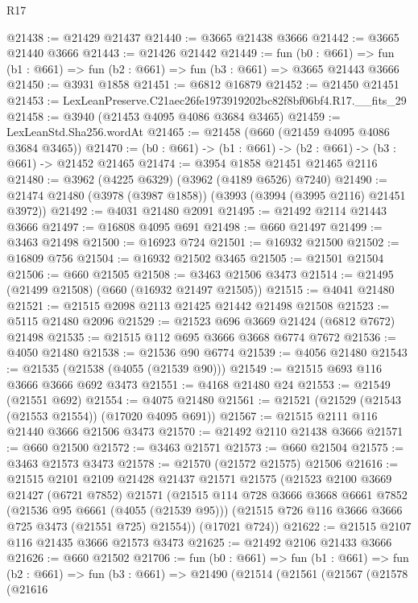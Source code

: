 \begin{lexlean}{R17}
\begin{coremodule}
@21438 := @21429 @21437
@21440 := @3665 @21438 @3666
@21442 := @3665 @21440 @3666
@21443 := @21426 @21442
@21449 := fun (b0 : @661) =>
  fun (b1 : @661) => fun (b2 : @661) => fun (b3 : @661) => @3665 @21443 @3666
@21450 := @3931 @1858
@21451 := @6812 @16879
@21452 := @21450 @21451
@21453 := LexLeanPreserve.C21aec26fe1973919202bc82f8bf06bf4.R17.__fits_29
@21458 := @3940 (@21453 @4095 @4086 @3684 @3465)
@21459 := LexLeanStd.Sha256.wordAt
@21465 := @21458 (@660 (@21459 @4095 @4086 @3684 @3465))
@21470 := (b0 : @661) -> (b1 : @661) -> (b2 : @661) -> (b3 : @661) -> @21452 @21465
@21474 := @3954 @1858 @21451 @21465 @2116
@21480 := @3962 (@4225 @6329) (@3962 (@4189 @6526) @7240)
@21490 := @21474 @21480 (@3978 (@3987 @1858)) (@3993 (@3994 (@3995 @2116) @21451 @3972))
@21492 := @4031 @21480 @2091
@21495 := @21492 @2114 @21443 @3666
@21497 := @16808 @4095 @691
@21498 := @660 @21497
@21499 := @3463 @21498
@21500 := @16923 @724
@21501 := @16932 @21500
@21502 := @16809 @756
@21504 := @16932 @21502 @3465
@21505 := @21501 @21504
@21506 := @660 @21505
@21508 := @3463 @21506 @3473
@21514 := @21495 (@21499 @21508) (@660 (@16932 @21497 @21505))
@21515 := @4041 @21480
@21521 := @21515 @2098 @2113 @21425 @21442 @21498 @21508
@21523 := @5115 @21480 @2096
@21529 := @21523 @696 @3669 @21424 (@6812 @7672) @21498
@21535 := @21515 @112 @695 @3666 @3668 @6774 @7672
@21536 := @4050 @21480
@21538 := @21536 @90 @6774
@21539 := @4056 @21480
@21543 := @21535 (@21538 (@4055 (@21539 @90)))
@21549 := @21515 @693 @116 @3666 @3666 @692 @3473
@21551 := @4168 @21480 @24
@21553 := @21549 (@21551 @692)
@21554 := @4075 @21480
@21561 := @21521 (@21529 (@21543 (@21553 @21554)) (@17020 @4095 @691))
@21567 := @21515 @2111 @116 @21440 @3666 @21506 @3473
@21570 := @21492 @2110 @21438 @3666
@21571 := @660 @21500
@21572 := @3463 @21571
@21573 := @660 @21504
@21575 := @3463 @21573 @3473
@21578 := @21570 (@21572 @21575) @21506
@21616 := @21515
    @2101
    @2109
    @21428
    @21437
    @21571
    @21575
    (@21523
      @2100
      @3669
      @21427
      (@6721 @7852)
      @21571
      (@21515
        @114
        @728
        @3666
        @3668
        @6661
        @7852
        (@21536 @95 @6661 (@4055 (@21539 @95)))
        (@21515 @726 @116 @3666 @3666 @725 @3473 (@21551 @725) @21554))
      (@17021 @724))
@21622 := @21515 @2107 @116 @21435 @3666 @21573 @3473
@21625 := @21492 @2106 @21433 @3666
@21626 := @660 @21502
@21706 := fun (b0 : @661) =>
  fun (b1 : @661) =>
  fun (b2 : @661) =>
  fun (b3 : @661) =>
  @21490
    (@21514
      (@21561
        (@21567
          (@21578
            (@21616

\end{coremodule}
\end{lexlean}
